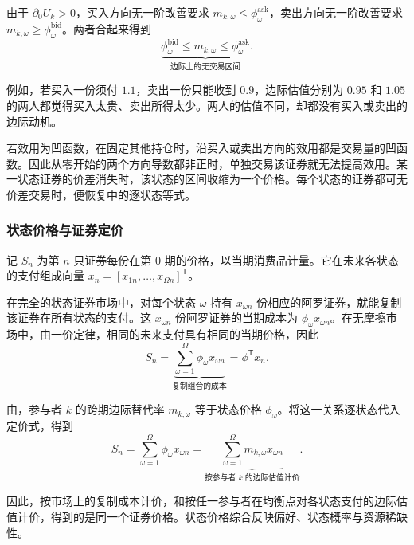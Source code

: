 由于 $\partial_0U_k>0$，买入方向无一阶改善要求 $m_{k,\omega}\le\phi_\omega^{\mathrm{ask}}$，卖出方向无一阶改善要求 $m_{k,\omega}\ge\phi_\omega^{\mathrm{bid}}$。两者合起来得到
\[
 \underbrace{\phi_\omega^{\mathrm{bid}}\le m_{k,\omega}\le\phi_\omega^{\mathrm{ask}}}_{\text{边际上的无交易区间}}.
\]

例如，若买入一份须付 $1.1$，卖出一份只能收到 $0.9$，边际估值分别为 $0.95$ 和 $1.05$ 的两人都觉得买入太贵、卖出所得太少。两人的估值不同，却都没有买入或卖出的边际动机。

若效用为凹函数，在固定其他持仓时，沿买入或卖出方向的效用都是交易量的凹函数。因此从零开始的两个方向导数都非正时，单独交易该证券就无法提高效用。某一状态证券的价差消失时，该状态的区间收缩为一个价格。每个状态的证券都可无价差交易时，便恢复中的逐状态等式。

\subsubsection{状态价格与证券定价}
记 $S_n$ 为第 $n$ 只证券每份在第 0 期的价格，以当期消费品计量。它在未来各状态的支付组成向量 $x_n=[x_{1n},\ldots,x_{\Omega n}]^{\mathsf T}$。

在完全的状态证券市场中，对每个状态 $\omega$ 持有 $x_{\omega n}$ 份相应的阿罗证券，就能复制该证券在所有状态的支付。这 $x_{\omega n}$ 份阿罗证券的当期成本为 $\phi_\omega x_{\omega n}$。在无摩擦市场中，由一价定律，相同的未来支付具有相同的当期价格，因此
\[
 S_n=\underbrace{\sum_{\omega=1}^{\Omega}\phi_\omega x_{\omega n}}_{\text{复制组合的成本}}
 =\phi^{\mathsf T}x_n.
\]

由，参与者 $k$ 的跨期边际替代率 $m_{k,\omega}$ 等于状态价格 $\phi_\omega$。将这一关系逐状态代入定价式，得到
\[
 S_n=\sum_{\omega=1}^{\Omega}\phi_\omega x_{\omega n}
 =\underbrace{\sum_{\omega=1}^{\Omega}m_{k,\omega}x_{\omega n}}_{\text{按参与者 }k\text{ 的边际估值计价}}.
\]

因此，按市场上的复制成本计价，和按任一参与者在均衡点对各状态支付的边际估值计价，得到的是同一个证券价格。状态价格综合反映偏好、状态概率与资源稀缺性。

